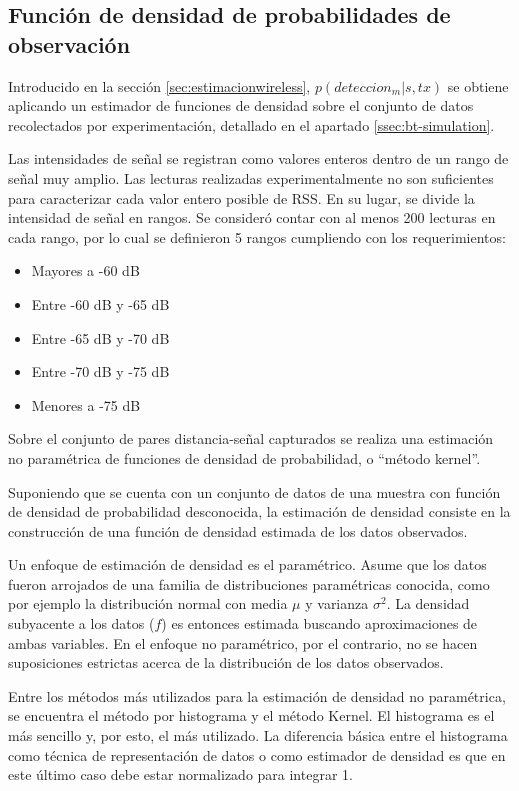 \subsection{Función de densidad de probabilidades de observación}\label{ssec:kernel}

Introducido en la sección \ref{sec:estimacionwireless}, $p(deteccion_m|s,tx)$ se obtiene aplicando un estimador de funciones de densidad sobre el conjunto de datos recolectados por experimentación, detallado en el apartado \ref{ssec:bt-simulation}. 

Las intensidades de señal se registran como valores enteros dentro de un rango de señal muy amplio. Las lecturas realizadas experimentalmente no son suficientes para caracterizar cada valor entero posible de RSS. En su lugar, se divide la intensidad de señal en rangos. Se consideró contar con al menos 200 lecturas en cada rango, por lo cual se definieron 5 rangos cumpliendo con los requerimientos:

\begin{itemize}
    \item Mayores a -60 dB
    \item Entre -60 dB y -65 dB
    \item Entre -65 dB y -70 dB
    \item Entre -70 dB y -75 dB
    \item Menores a -75 dB 
\end{itemize}

Sobre el conjunto de pares distancia-señal capturados se realiza una estimación no paramétrica de funciones de densidad de probabilidad, o ``método kernel''. 

Suponiendo que se cuenta con un conjunto de datos de una muestra con función de densidad de probabilidad desconocida, la estimación de densidad consiste en la construcción de una función de densidad estimada de los datos observados.

Un enfoque de estimación de densidad es el paramétrico. Asume que los datos fueron arrojados de una familia de distribuciones paramétricas conocida, como por ejemplo la distribución normal con media $\mu$ y varianza $\sigma^2$. La densidad subyacente a los datos ($f$) es entonces estimada buscando aproximaciones de ambas variables. En el enfoque no paramétrico, por el contrario, no se hacen suposiciones estrictas acerca de la distribución de los datos observados.

Entre los métodos más utilizados para la estimación de densidad no paramétrica, se encuentra el método por histograma y el método Kernel. El histograma es el más sencillo y, por esto, el más utilizado. La diferencia básica entre el histograma como técnica de representación de datos o como estimador de densidad es que en este último caso debe estar normalizado para integrar 1. 

